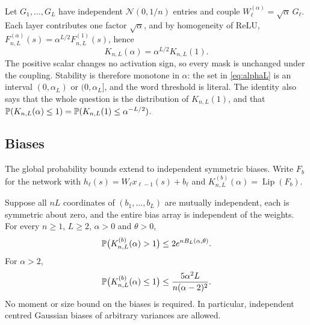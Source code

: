 Let $G_1,\dots,G_L$ have independent $\mathcal N(0,1/n)$ entries and couple $W^{(\alpha)}_\ell=\sqrt\alpha\,G_\ell$. Each layer contributes one factor $\sqrt\alpha$, and by homogeneity of ReLU, $F^{(\alpha)}_{n,L}(s)=\alpha^{L/2}F^{(1)}_{n,L}(s)$, hence
\begin{equation}\label{eq:scaling}
K_{n,L}(\alpha)=\alpha^{L/2}K_{n,L}(1).
\end{equation}
The positive scalar changes no activation sign, so every mask is unchanged under the coupling. Stability is therefore monotone in $\alpha$: the set in \cref{eq:alphaL} is an interval $(0,\alpha_L)$ or $(0,\alpha_L]$, and the word threshold is literal. The identity also says that the whole question is the distribution of $K_{n,L}(1)$, and that $\mathbb{P}(K_{n,L}(\alpha)\le1)=\mathbb{P}(K_{n,L}(1)\le\alpha^{-L/2})$.

\subsection{Biases}
\label{sec:biases}

The global probability bounds extend to independent symmetric biases. Write $F_b$ for the network with $h_\ell(s)=W_\ell x_{\ell-1}(s)+b_\ell$ and $K^{(b)}_{n,L}(\alpha)=\operatorname{Lip}(F_b)$.

\begin{theorem}\label{thm:bias}
Suppose all $nL$ coordinates of $(b_1,\dots,b_L)$ are mutually independent, each is symmetric about zero, and the entire bias array is independent of the weights. For every $n\ge1$, $L\ge2$, $\alpha>0$ and $\theta>0$,
\[
\mathbb{P}\bigl(K^{(b)}_{n,L}(\alpha)>1\bigr)\le2e^{nB_L(\alpha,\theta)}.
\]
For $\alpha>2$,
\[
\mathbb{P}\bigl(K^{(b)}_{n,L}(\alpha)\le1\bigr)\le\frac{5\alpha^2L}{n(\alpha-2)^2}.
\]
No moment or size bound on the biases is required. In particular, independent centred Gaussian biases of arbitrary variances are allowed.
\end{theorem}

